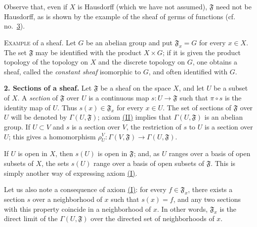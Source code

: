 Observe that, even if $X$ is Hausdorff (which we have not assumed), $\mathfrak{F}$ need not be Hausdorff, as is shown by the example of the sheaf of germs of functions (cf. no.~\hyperref[fac:I:1:no:3]{3}).

\textsc{Example} of a sheaf. Let $G$ be an abelian group and put $\mathfrak{F}_x=G$ for every $x\in X$. The set $\mathfrak{F}$ may be identified with the product $X\times G$; if it is given the product topology of the topology on $X$ and the discrete topology on $G$, one obtains a sheaf, called the \textit{constant sheaf} isomorphic to $G$, and often identified with $G$.

\medskip
{}\label{fac:I:1:no:2}
\textbf{2. Sections of a sheaf.} Let $\mathfrak{F}$ be a sheaf on the space $X$, and let $U$ be a subset of $X$. A \textit{section} of $\mathfrak{F}$ over $U$ is a continuous map $s:U\to\mathfrak{F}$ such that $\pi\circ s$ is the identity map of $U$. Thus $s(x)\in\mathfrak{F}_x$ for every $x\in U$. The set of sections of $\mathfrak{F}$ over $U$ will be denoted by $\Gamma(U,\mathfrak{F})$; axiom \hyperref[fac:I:1:no:1:axiom:II]{(II)} implies that $\Gamma(U,\mathfrak{F})$ is an abelian group. If $U\subset V$ and $s$ is a section over $V$, the restriction of $s$ to $U$ is a section over $U$; this gives a homomorphism $\rho_U^V:\Gamma(V,\mathfrak{F})\to\Gamma(U,\mathfrak{F})$.

If $U$ is open in $X$, then $s(U)$ is open in $\mathfrak{F}$; and, as $U$ ranges over a basis of open subsets of $X$, the sets $s(U)$ range over a basis of open subsets of $\mathfrak{F}$. This is simply another way of expressing axiom \hyperref[fac:I:1:no:1:axiom:I]{(I)}.

Let us also note a consequence of axiom \hyperref[fac:I:1:no:1:axiom:I]{(I)}: for every $f\in\mathfrak{F}_x$, there exists a section $s$ over a neighborhood of $x$ such that $s(x)=f$, and any two sections with this property coincide in a neighborhood of $x$. In other words, $\mathfrak{F}_x$ is the direct limit of the $\Gamma(U,\mathfrak{F})$ over the directed set of neighborhoods of $x$.
